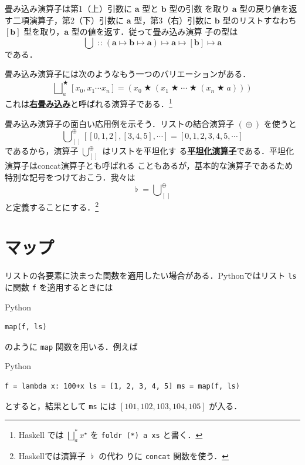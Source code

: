 \documentclass[a5paper,twoside,fleqn]{jsbook}
\newcommand{\programminglanguage}[1]{\textsf{#1}}
\newcommand{\haskell}{\programminglanguage{Haskell}}
\newcommand{\python}{\programminglanguage{Python}}
\newcommand{\keyword}[1]{{\underline{\textbf{#1}}}}
\newcommand{\code}[1]{\texttt{#1}}
\newenvironment{pythoncode}{\begin{itembox}[r]{\python}}{\end{itembox}}
\newcommand{\mEmptyList}{{[\,]}}
\DeclareMathOperator{\mAppend}{\oplus}
\DeclareMathOperator{\mBinOp}{\bigstar}
\DeclareMathOperator{\mConcat}{\flat}
\DeclareMathOperator*{\mFold}{\bigcup}
\DeclareMathOperator*{\mFoldRight}{\bigsqcup}
\DeclareMathOperator{\mIn}{{:\!:}}
\DeclareMathOperator{\mMapsTo}{\mapsto}
\newcommand{\mType}[1]{\mathbf{#1}}
\newcommand{\mListType}[1]{[\mType{#1}]}
\newcommand{\mListWith}[1]{\left[#1\right]}
\newcommand{\mList}[1]{{#1}^\mathrm{\star}}
\newcommand{\mProj}[2]{#1\mMapsTo#2}
\begin{document}
畳み込み演算子は第1（上）引数に $\mType{a}$ 型と $\mType{b}$ 型の引数
を取り $\mType{a}$ 型の戻り値を返す二項演算子，第2（下）引数に
$\mType{a}$ 型，第3（右）引数に $\mType{b}$ 型のリストすなわち
$\mListType{b}$ 型を取り，$\mType{a}$ 型の値を返す．従って畳み込み演算
子の型は
\begin{equation}
\mFold \mIn{} \mProj{
  (\mProj{\mType{a}}{\mProj{\mType{b}}{\mType{a}}}) } {
  \mProj{\mType{a}}{\mProj{\mListType{b}}{\mType{a}}} }
\end{equation}
である．

畳み込み演算子には次のようなもう一つのバリエーションがある．
\begin{equation}
\mFoldRight^{\mBinOp}_{a}\mListWith{x_0,x_1\dotsb x_n}
=(x_0\mBinOp(x_1\mBinOp\dotsb\mBinOp(x_n\mBinOp a)))
\end{equation}
これは\keyword{右畳み込み}と呼ばれる演算子である．\footnote{\haskell
  では $\mFoldRight^{*}_a\mList{x}$ を \code{foldr (*) a xs} と書く．}

畳み込み演算子の面白い応用例を示そう．リストの結合演算子 $(\mAppend)$
を使うと
\begin{equation}
  \mFold_\mEmptyList^{\mAppend}\mListWith{\mListWith{0,1,2},\mListWith{3,4,5},\dotsb}
  =\mListWith{0,1,2,3,4,5,\dotsb}
\end{equation}
であるから，演算子 $\mFold_\mEmptyList^{\mAppend}$ はリストを平坦化す
る\keyword{平坦化演算子}である．平坦化演算子はconcat演算子とも呼ばれる
こともあるが，基本的な演算子であるため特別な記号をつけておこう．我々は
\begin{equation}
\mConcat=\mFold_\mEmptyList^{\mAppend}
\end{equation}
と定義することにする．\footnote{\haskell では演算子 $\mConcat$ の代わ
  りに \code{concat} 関数を使う．}

\section{マップ}

リストの各要素に決まった関数を適用したい場合がある．\python ではリスト
\code{ls} に関数 \code{f} を適用するときには
\begin{pythoncode}
\begin{verbatim}
map(f, ls)
\end{verbatim}
\end{pythoncode}
のように \code{map} 関数を用いる．例えば
\begin{pythoncode}
\begin{verbatim}
f = lambda x: 100+x ls = [1, 2, 3, 4, 5] ms = map(f, ls)
\end{verbatim}
\end{pythoncode}
とすると，結果として \code{ms} には $\mListWith{101,102,103,104,105}$
が入る．
\end{document}
